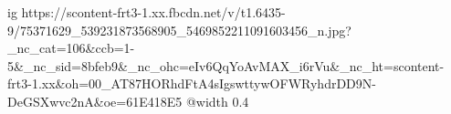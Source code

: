  
 
 
 
 

\ifcmt
  ig https://scontent-frt3-1.xx.fbcdn.net/v/t1.6435-9/75371629_539231873568905_5469852211091603456_n.jpg?_nc_cat=106&ccb=1-5&_nc_sid=8bfeb9&_nc_ohc=eIv6QqYoAvMAX_i6rVu&_nc_ht=scontent-frt3-1.xx&oh=00_AT87HORhdFtA4sIgswttywOFWRyhdrDD9N-DeGSXwvc2nA&oe=61E418E5
  @width 0.4
\fi

